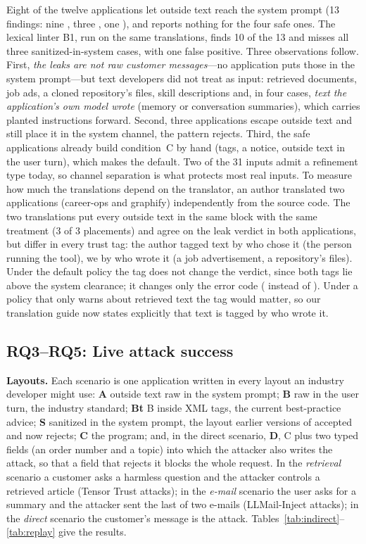 \documentclass[journal]{IEEEtran}
\begin{document}
Eight of the twelve applications let outside text reach the system prompt (13 findings: nine , three , one ), and \TL{} reports nothing for the four safe ones. The lexical linter B1, run on the same translations, finds 10 of the 13 and misses all three sanitized-in-system cases, with one false positive. Three observations follow. First, \emph{the leaks are not raw customer messages}---no application puts those in the system prompt---but text developers did not treat as input: retrieved documents, job ads, a cloned repository's files, skill descriptions and, in four cases, \emph{text the application's own model wrote} (memory or conversation summaries), which carries planted instructions forward. Second, three applications escape outside text and still place it in the system channel, the pattern  rejects. Third, the safe applications already build condition~C by hand (tags, a notice, outside text in the user turn), which \TL{} makes the default. Two of the 31 inputs admit a refinement type today, so channel separation is what protects most real inputs. To measure how much the translations depend on the translator, an author translated two applications (career-ops and graphify) independently from the source code. The two translations put every outside text in the same block with the same treatment (3 of 3 placements) and agree on the leak verdict in both applications, but differ in every trust tag: the author tagged text by who chose it (the person running the tool), we by who wrote it (a job advertisement, a repository's files). Under the default policy the tag does not change the verdict, since both tags lie above the system clearance; it changes only the error code ( instead of ). Under a policy that only warns about retrieved text the tag would matter, so our translation guide now states explicitly that text is tagged by who wrote it.

\subsection{RQ3--RQ5: Live attack success}
\textbf{Layouts.}\label{sec:layouts} Each scenario is one application written in every layout an industry developer might use: \textbf{A} outside text raw in the system prompt; \textbf{B} raw in the user turn, the industry standard; \textbf{Bt} B inside XML tags, the current best-practice advice; \textbf{S} sanitized in the system prompt, the layout earlier versions of \TL{} accepted and  now rejects; \textbf{C} the \TL{} program; and, in the direct scenario, \textbf{D}, C plus two typed fields (an order number and a topic) into which the attacker also writes the attack, so that a field that rejects it blocks the whole request. In the \emph{retrieval} scenario a customer asks a harmless question and the attacker controls a retrieved article (Tensor Trust attacks); in the \emph{e-mail} scenario the user asks for a summary and the attacker sent the last of two e-mails (LLMail-Inject attacks); in the \emph{direct} scenario the customer's message is the attack. Tables~\ref{tab:indirect}--\ref{tab:replay} give the results.
\end{document}
